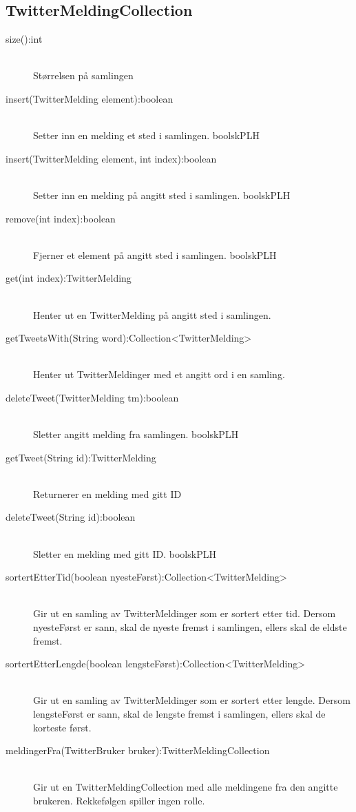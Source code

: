 \documentclass{article}
\begin{document}
\subsection{TwitterMeldingCollection}
\label{subsec:TwitterMeldingCollection}
\begin{description}
\item [size():int] \ \\
  Størrelsen på samlingen
\item [insert(TwitterMelding element):boolean] \ \\
  Setter inn en melding et sted i samlingen. boolskPLH
\item [insert(TwitterMelding element, int index):boolean] \ \\
  Setter inn en melding på angitt sted i samlingen. boolskPLH
\item [remove(int index):boolean] \ \\
  Fjerner et element på angitt sted i samlingen. boolskPLH
\item [get(int index):TwitterMelding] \ \\
  Henter ut en TwitterMelding på angitt sted i samlingen.
\item [getTweetsWith(String word):Collection<TwitterMelding>] \ \\
  Henter ut TwitterMeldinger med et angitt ord i en samling.
\item [deleteTweet(TwitterMelding tm):boolean] \ \\
  Sletter angitt melding fra samlingen. boolskPLH
\item [getTweet(String id):TwitterMelding] \ \\
  Returnerer en melding med gitt ID
\item [deleteTweet(String id):boolean] \ \\
  Sletter en melding med gitt ID. boolskPLH
\item [sortertEtterTid(boolean nyesteFørst):Collection<TwitterMelding>] \ \\
  Gir ut en samling av TwitterMeldinger som er sortert etter tid.
  Dersom nyesteFørst er sann, skal de nyeste fremst i samlingen, ellers skal de eldste fremst.
\item [sortertEtterLengde(boolean lengsteFørst):Collection<TwitterMelding>] \ \\
  Gir ut en samling av TwitterMeldinger som er sortert etter lengde.
  Dersom lengsteFørst er sann, skal de lengste fremst i samlingen, ellers skal de korteste først.
\item [meldingerFra(TwitterBruker bruker):TwitterMeldingCollection] \ \\
  Gir ut en TwitterMeldingCollection med alle meldingene fra den angitte brukeren.
  Rekkefølgen spiller ingen rolle.
\end{description}
\newpage
\end{document}
